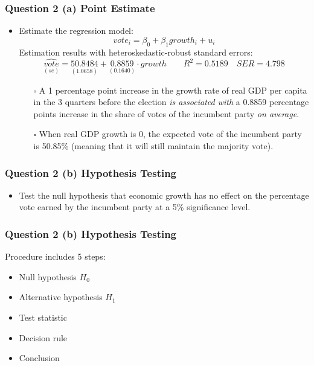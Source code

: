 \documentclass[11pt, xcolor=x11names,compress]{beamer}
\begin{document}
\begin{frame}[fragile,t]
\frametitle{Question 2 (a) Point Estimate}
\begin{itemize}
    \item Estimate the regression model:
$$
vote_i = \beta_0 + \beta_1 growth_i + u_i
$$
\pause
Estimation results with heteroskedastic-robust standard errors:
$$\underset{(se)}{\widehat{vote}} = \underset{(1.0658)}{50.8484} +  \underset{(0.1640)}{0.8859} \cdot growth \qquad R^2=0.5189 \quad SER=4.798$$ 
\begin{itemize}
    \item [$\square$] A 1 percentage point increase in the growth rate of real GDP per capita in the 3 quarters before the election \textit{is associated with} a 0.8859 percentage points  increase in the share of votes of the incumbent party \textit{on average}.  \\
    \vspace{2mm}
    \item [$\square$] When real GDP growth is 0, the expected vote of the
    incumbent party is 50.85\% (meaning that it will still maintain the majority vote).
\end{itemize}
\end{itemize}

\end{frame}
\begin{frame}[fragile,t]
\frametitle{Question 2 (b) Hypothesis Testing} 
\begin{itemize}
    \item Test the null hypothesis that economic growth has no effect on the percentage vote earned by the incumbent party at a 5\% significance level.
\end{itemize}
\hyperlink{Hypothesis}{}
\end{frame}

\begin{frame}[fragile,t]
\linespread{1.3}
\frametitle{Question 2 (b) Hypothesis Testing}

Procedure includes 5 steps:
\begin{itemize}
    \item Null hypothesis $H_0$
    \item Alternative hypothesis $H_1$
    \item Test statistic
    \item Decision rule
    \item Conclusion
\end{itemize}

\end{frame}
\end{document}
